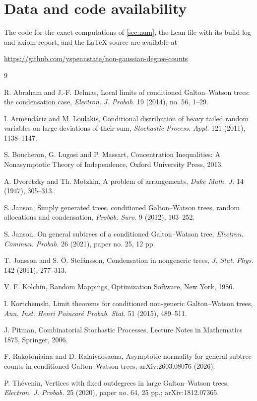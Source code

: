 \documentclass[11pt]{amsart}
\theoremstyle{definition}
\begin{document}
\section*{Data and code availability}
The code for the exact computations of \cref{sec:num}, the Lean file with its build log and axiom report, and the \LaTeX{} source are available at
\begin{center}
\url{https://github.com/yspennstate/non-gaussian-degree-counts}
\end{center}

\begin{thebibliography}{9}

 R. Abraham and J.-F. Delmas, Local limits of conditioned Galton--Watson trees: the condensation case, \emph{Electron. J. Probab.} 19 (2014), no. 56, 1--29.

 I. Armend\'ariz and M. Loulakis, Conditional distribution of heavy tailed random variables on large deviations of their sum, \emph{Stochastic Process. Appl.} 121 (2011), 1138--1147.

 S. Boucheron, G. Lugosi and P. Massart, Concentration Inequalities: A Nonasymptotic Theory of Independence, Oxford University Press, 2013.

 A. Dvoretzky and Th. Motzkin, A problem of arrangements, \emph{Duke Math. J.} 14 (1947), 305--313.

 S. Janson, Simply generated trees, conditioned Galton--Watson trees, random allocations and condensation, \emph{Probab. Surv.} 9 (2012), 103--252.

 S. Janson, On general subtrees of a conditioned Galton--Watson tree, \emph{Electron. Commun. Probab.} 26 (2021), paper no. 25, 12 pp.

 T. Jonsson and S. \"O. Stef\'ansson, Condensation in nongeneric trees, \emph{J. Stat. Phys.} 142 (2011), 277--313.

 V. F. Kolchin, Random Mappings, Optimization Software, New York, 1986.

 I. Kortchemski, Limit theorems for conditioned non-generic Galton--Watson trees, \emph{Ann. Inst. Henri Poincar\'e Probab. Stat.} 51 (2015), 489--511.

 J. Pitman, Combinatorial Stochastic Processes, Lecture Notes in Mathematics 1875, Springer, 2006.

 F. Rakotoniaina and D. Ralaivaosaona, Asymptotic normality for general subtree counts in conditioned Galton--Watson trees, arXiv:2603.08076 (2026).

 P. Th\'evenin, Vertices with fixed outdegrees in large Galton--Watson trees, \emph{Electron. J. Probab.} 25 (2020), paper no. 64, 25 pp.; arXiv:1812.07365.

\end{thebibliography}
\end{document}
